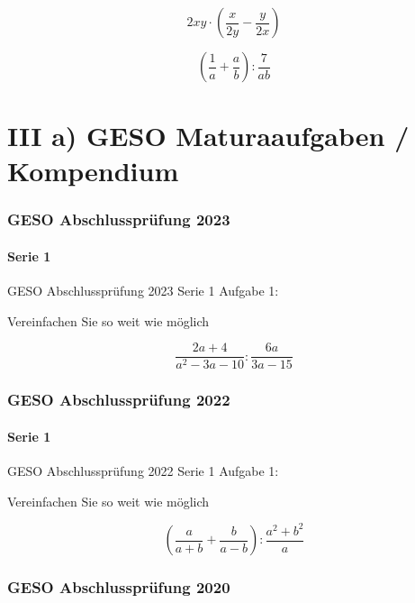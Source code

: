 {\begin{bbwAufgabenBlock}
\item $$2xy \cdot{} \left( \frac{x}{2y} - \frac{y}{2x} \right)$$

\item $$\left( \frac1a + \frac{a}b \right) : \frac7{ab}$$
\end{bbwAufgabenBlock}
\newpage


\part*{III a) GESO Maturaaufgaben / Kompendium}


\section*{GESO Abschlussprüfung 2023}
\subsection*{Serie 1}
GESO Abschlussprüfung 2023 Serie 1 Aufgabe 1:

Vereinfachen Sie so weit wie möglich

$$\frac{2a+4}{a^2-3a-10} : \frac{6a}{3a-15}$$


\section*{GESO Abschlussprüfung 2022}
\subsection*{Serie 1}
GESO Abschlussprüfung 2022 Serie 1 Aufgabe 1:

Vereinfachen Sie so weit wie möglich

$$\left( \frac{a}{a+b} + \frac{b}{a-b} \right) : \frac{a^2+b^2}a$$




\section*{GESO Abschlussprüfung 2020}
}
